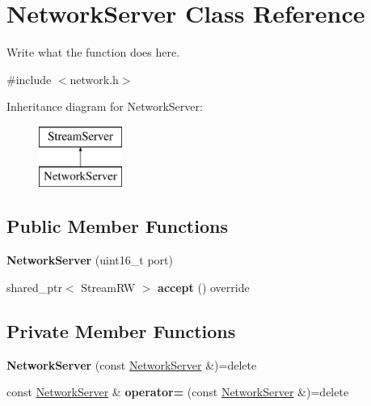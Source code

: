 \hypertarget{classNetworkServer}{\section{Network\+Server Class Reference}
\label{classNetworkServer}
}


Write what the function does here.  




{\ttfamily \#include $<$network.\+h$>$}

Inheritance diagram for Network\+Server\+:\begin{figure}[H]
\begin{center}
\leavevmode
\includegraphics[height=2.000000cm]{classNetworkServer}
\end{center}
\end{figure}
\subsection*{Public Member Functions}
\begin{DoxyCompactItemize}
\item 
\hypertarget{classNetworkServer_abf7631e55048fc28a4edcaebd7f88e2e}{{\bfseries Network\+Server} (uint16\+\_\+t port)}\label{classNetworkServer_abf7631e55048fc28a4edcaebd7f88e2e}

\item 
\hypertarget{classNetworkServer_a88d231dddf7c327f5e68686e1874001a}{shared\+\_\+ptr$<$ Stream\+R\+W $>$ {\bfseries accept} () override}\label{classNetworkServer_a88d231dddf7c327f5e68686e1874001a}

\end{DoxyCompactItemize}
\subsection*{Private Member Functions}
\begin{DoxyCompactItemize}
\item 
\hypertarget{classNetworkServer_afa83400cf119ab3f619919a006f0e0ba}{{\bfseries Network\+Server} (const \hyperlink{classNetworkServer}{Network\+Server} \&)=delete}\label{classNetworkServer_afa83400cf119ab3f619919a006f0e0ba}

\item 
\hypertarget{classNetworkServer_ae7669127d3dbd8e027fcf15cca9e5859}{const \hyperlink{classNetworkServer}{Network\+Server} \& {\bfseries operator=} (const \hyperlink{classNetworkServer}{Network\+Server} \&)=delete}\label{classNetworkServer_ae7669127d3dbd8e027fcf15cca9e5859}

\end{DoxyCompactItemize}
